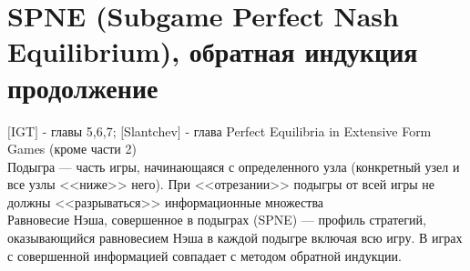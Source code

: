 \documentclass[pdftex,12pt,a4paper]{article}
\begin{document}
\section{SPNE (Subgame Perfect Nash Equilibrium), обратная индукция продолжение}

$[$IGT$]$ - главы 5,6,7; $[$Slantchev$]$ - глава Perfect Equilibria in Extensive Form Games (кроме части 2) \\

Подыгра --- часть игры, начинающаяся с определенного узла (конкретный узел и все узлы <<ниже>> него). При <<отрезании>> подыгры от всей игры не должны <<разрываться>> информационные множества\\
Равновесие Нэша, совершенное в подыграх (SPNE) --- профиль стратегий, оказывающийся равновесием Нэша в каждой подыгре включая всю игру. В играх с совершенной информацией совпадает с методом обратной индукции. \\
\end{document}
